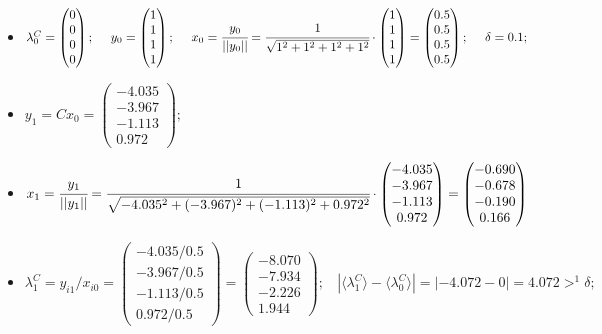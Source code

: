 \begin{itemize}
    \item
    $\lambda^C_0 =
    \begin{pmatrix}
        0\\0\\0\\0
    \end{pmatrix};~~~~
    y_0 =
    \begin{pmatrix}
        1\\1\\1\\1
    \end{pmatrix};~~~~
    x_0 = \cfrac{y_0}{||y_0||} = \cfrac{1}{\sqrt{1^2+1^2+1^2+1^2}}\cdot
    \begin{pmatrix}
        1\\1\\1\\1
    \end{pmatrix} =
    \begin{pmatrix}
        0.5\\0.5\\0.5\\0.5
    \end{pmatrix};~~~~
    \delta = 0.1;$



    \item
    $y_1 = Cx_0 =
    \begin{pmatrix}
        -4.035\\-3.967\\-1.113\\0.972
    \end{pmatrix};$

    \item
    $x_1 = \cfrac{y_1}{||y_1||} = \cfrac{1}{\sqrt{-4.035^2+(-3.967)^2+(-1.113)^2+0.972^2}}\cdot
    \begin{pmatrix}
        -4.035\\-3.967\\-1.113\\0.972
    \end{pmatrix} =
    \begin{pmatrix}
        -0.690\\-0.678\\-0.190\\0.166
    \end{pmatrix}$

    \item
    $\lambda^C_1 = y_{i1} / x_{i0} =
    \begin{pmatrix}
        -4.035/0.5\\
        -3.967/0.5\\
        -1.113/0.5\\
         0.972/0.5
    \end{pmatrix} =
    \begin{pmatrix}
        -8.070\\-7.934\\-2.226\\1.944
    \end{pmatrix};~~~~
    |\langle\lambda^C_1\rangle-\langle\lambda^C_0\rangle| = |-4.072-0| = 4.072 >^1 \delta;$





\end{itemize}
